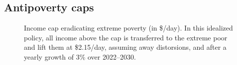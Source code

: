 \subsection{Antipoverty caps\label{subsec:cap}}

\begin{figure}[!b]
  \caption[Anti-\textit{extreme-poverty} cap in 2030 after 3\% growth.]{Income cap eradicating extreme poverty (in \$/day). In this idealized policy, all income above the cap is transferred to the extreme poor and lift them at \$2.15/day, assuming away distorsions, and after a yearly growth of 3\% over 2022--2030. %
  }\label{fig:antipoverty_cap}
\end{figure} 


